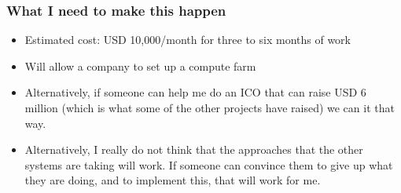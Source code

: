 \documentclass{beamer}
\begin{document}
\begin{frame}
  \frametitle{What I need to make this happen}
  \begin{itemize}
  \item Estimated cost: USD 10,000/month for three to six months of work
  \item Will allow a company to set up a compute farm
  \item Alternatively, if someone can help me do an ICO that can
    raise USD 6 million (which is what some of the other projects
    have raised) we can it that way.
  \item Alternatively, I really do not think that the approaches that
    the other systems are taking will work.  If someone can convince
    them to give up what they are doing, and to implement this, that
    will work for me.
  \end{itemize}
\end{frame}
\end{document}
